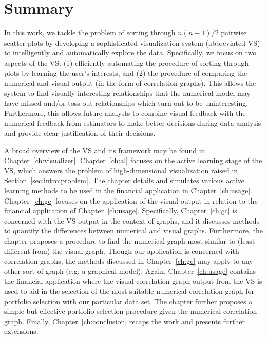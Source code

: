 \section{Summary}
\label{sec:intro:summary}

In this work, we tackle the problem of sorting through $n(n-1)/2$ pairwise 
scatter plots by developing a sophisticated visualization
system (abbreviated VS) to intelligently and automatically explore the data. 
Specifically, we focus on two aspects of the VS: 
(1) efficiently automating the procedure of sorting through plots by learning 
the user's interests, and (2) the procedure of comparing the numerical and 
visual output (in the form of correlation graphs).
This allows the system to find visually interesting relationships that the
numerical model may have missed and/or toss out relationships which turn out to
be uninteresting. Furthermore, this allows future analysts to combine visual
feedback with the numerical feedback from estimators to make better decisions
during data analysis and provide clear justification of their decisions.

A broad overview of the VS and its framework may be found in
Chapter~\ref{ch:visualizer}. Chapter~\ref{ch:al} focuses on the active
learning stage of the VS, which answers the problem of high-dimensional 
visualization raised in Section~\ref{sec:intro:problem}. 
The chapter details and simulates various active learning methods to be used in 
the financial application in Chapter~\ref{ch:usage}. 
Chapter~\ref{ch:gc} focuses on the application of the visual output in relation 
to the financial application of Chapter~\ref{ch:usage}. Specifically, 
Chapter~\ref{ch:gc} is concerned with the VS output in the context of graphs, 
and it discusses methods to 
quantify the differences between numerical and visual graphs. Furthermore, the 
chapter proposes a procedure to find the numerical graph most similar to (least 
different from) the visual graph. Though our  application is concerned with 
correlation graphs, the methods discussed in Chapter~\ref{ch:gc} may apply to 
any other sort of graph (e.g. a graphical model). 
Again, Chapter~\ref{ch:usage} contains the financial application where the 
visual correlation graph output from the VS is used to aid in the selection of 
the most suitable numerical correlation graph for portfolio selection with our 
particular data set. The chapter further proposes a simple but effective 
portfolio selection procedure given the numerical correlation graph.
Finally, Chapter~\ref{ch:conclusion} recaps the work and presents further 
extensions.

